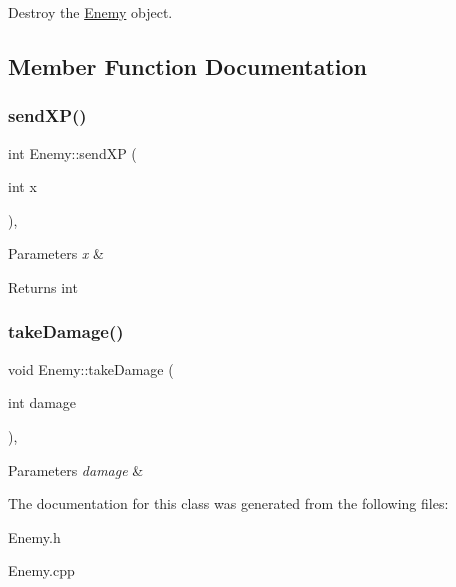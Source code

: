 Destroy the \mbox{\hyperlink{classEnemy}{Enemy}} object. 



\subsection{Member Function Documentation}
\mbox{\label{classEnemy_a755e7d44eb291517f28e9cad2c6c7111}} 
\subsubsection{\texorpdfstring{sendXP()}{sendXP()}}
{\footnotesize\ttfamily int Enemy\+::send\+XP (\begin{DoxyParamCaption}\item[{int}]{x }\end{DoxyParamCaption})\hspace{0.3cm}{\ttfamily [protected]}, {\ttfamily [virtual]}}


\begin{DoxyParams}{Parameters}
{\em x} & \\
\hline
\end{DoxyParams}
\begin{DoxyReturn}{Returns}
int 
\end{DoxyReturn}
\mbox{\label{classEnemy_ae01c62a474fbcd547000ff1068976d49}} 
\subsubsection{\texorpdfstring{takeDamage()}{takeDamage()}}
{\footnotesize\ttfamily void Enemy\+::take\+Damage (\begin{DoxyParamCaption}\item[{int}]{damage }\end{DoxyParamCaption})\hspace{0.3cm}{\ttfamily [protected]}, {\ttfamily [virtual]}}


\begin{DoxyParams}{Parameters}
{\em damage} & \\
\hline
\end{DoxyParams}


The documentation for this class was generated from the following files\+:\begin{DoxyCompactItemize}
\item 
Enemy.\+h\item 
Enemy.\+cpp\end{DoxyCompactItemize}
